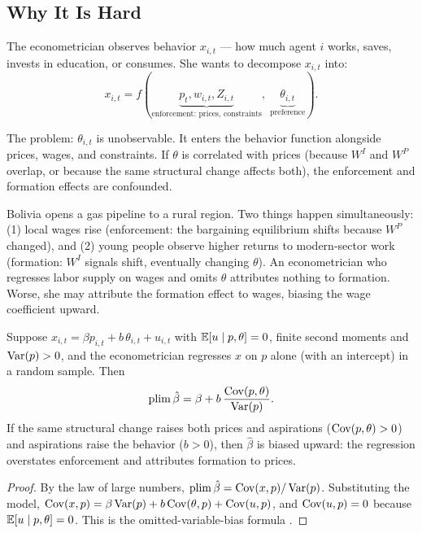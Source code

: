 \documentclass[../structural_economics_book.tex]{subfiles}
\begin{document}
\subsection{Why It Is Hard}

The econometrician observes behavior $x_{i,t}$ --- how much agent $i$ works, saves, invests in education, or consumes. She wants to decompose $x_{i,t}$ into:
\begin{equation}\label{ch11:eq:decomp_obs}
x_{i,t} = f(\underbrace{p_t, w_{i,t}, Z_{i,t}}_{\text{enforcement: prices, constraints}}, \;\underbrace{\theta_{i,t}}_{\text{preference}}).
\end{equation}

The problem: $\theta_{i,t}$ is unobservable. It enters the behavior function alongside prices, wages, and constraints. If $\theta$ is correlated with prices (because $W^I$ and $W^P$ overlap, or because the same structural change affects both), the enforcement and formation effects are confounded.

\begin{example}\label{ch11:ex:confound}
Bolivia opens a gas pipeline to a rural region. Two things happen simultaneously: (1) local wages rise (enforcement: the bargaining equilibrium shifts because $W^P$ changed), and (2) young people observe higher returns to modern-sector work (formation: $W^I$ signals shift, eventually changing $\theta$). An econometrician who regresses labor supply on wages and omits $\theta$ attributes nothing to formation. Worse, she may attribute the formation effect to wages, biasing the wage coefficient upward.
\end{example}

\begin{proposition}\label{ch11:prop:challenge}
Suppose $x_{i,t} = \beta p_{i,t} + b\,\theta_{i,t} + u_{i,t}$ with $\mathbb{E}[u \mid p, \theta] = 0$, finite second moments and $\operatorname{Var}(p) > 0$, and the econometrician regresses $x$ on $p$ alone (with an intercept) in a random sample. Then
\[
\operatorname{plim}\hat{\beta} = \beta + b\,\frac{\operatorname{Cov}(p, \theta)}{\operatorname{Var}(p)}.
\]
If the same structural change raises both prices and aspirations ($\operatorname{Cov}(p, \theta) > 0$) and aspirations raise the behavior ($b > 0$), then $\hat{\beta}$ is biased upward: the regression overstates enforcement and attributes formation to prices.
\end{proposition}

\begin{proof}
By the law of large numbers, $\operatorname{plim}\hat{\beta} = \operatorname{Cov}(x, p)/\operatorname{Var}(p)$. Substituting the model, $\operatorname{Cov}(x, p) = \beta\operatorname{Var}(p) + b\operatorname{Cov}(\theta, p) + \operatorname{Cov}(u, p)$, and $\operatorname{Cov}(u, p) = 0$ because $\mathbb{E}[u \mid p, \theta] = 0$. This is the omitted-variable-bias formula \citep[\S3.2.2]{angrist2009mostly}.
\end{proof}
\end{document}
